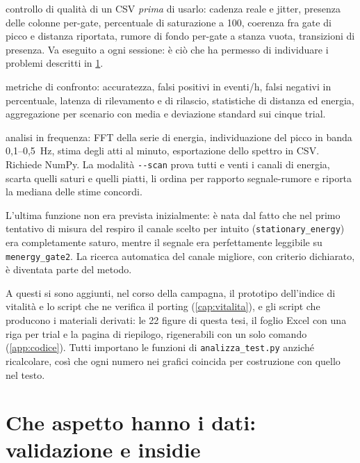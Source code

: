 \begin{description}[leftmargin=1.4em,style=nextline,itemsep=3pt]
  \item[\texttt{analisi/verifica\_engineering.py}] controllo di qualità di un CSV
    \emph{prima} di usarlo: cadenza reale e jitter, presenza delle colonne per-gate,
    percentuale di saturazione a 100, coerenza fra gate di picco e distanza
    riportata, rumore di fondo per-gate a stanza vuota, transizioni di presenza. Va
    eseguito a ogni sessione: è ciò che ha permesso di individuare i problemi
    descritti in \cref{sec:insidie}.
  \item[\texttt{analisi/analizza\_test.py}] metriche di confronto: accuratezza,
    falsi positivi in eventi/h, falsi negativi in percentuale, latenza di
    rilevamento e di rilascio, statistiche di distanza ed energia, aggregazione per
    scenario con media e deviazione standard sui cinque trial.
  \item[\texttt{analisi/analizza\_respiro.py}] analisi in frequenza: FFT della
    serie di energia, individuazione del picco in banda 0,1--0,5~Hz, stima degli
    atti al minuto, esportazione dello spettro in CSV. Richiede NumPy. La modalità
    \texttt{-{}-scan} prova tutti e venti i canali di energia, scarta quelli saturi
    e quelli piatti, li ordina per rapporto segnale-rumore e riporta la mediana
    delle stime concordi.
\end{description}

L'ultima funzione non era prevista inizialmente: è nata dal fatto che nel primo
tentativo di misura del respiro il canale scelto per intuito
(\texttt{stationary\_energy}) era completamente saturo, mentre il segnale era
perfettamente leggibile su \texttt{menergy\_gate2}. La ricerca automatica del
canale migliore, con criterio dichiarato, è diventata parte del metodo.

A questi si sono aggiunti, nel corso della campagna, il prototipo dell'indice di
vitalità e lo script che ne verifica il porting (\cref{cap:vitalita}), e gli script
che producono i materiali derivati: le 22 figure di questa tesi, il foglio Excel con
una riga per trial e la pagina di riepilogo, rigenerabili con un solo comando
(\cref{app:codice}). Tutti importano le funzioni di \texttt{analizza\_test.py}
anziché ricalcolare, così che ogni numero nei grafici coincida per costruzione con
quello nel testo.

\section{Che aspetto hanno i dati: validazione e insidie}
\label{sec:insidie}

